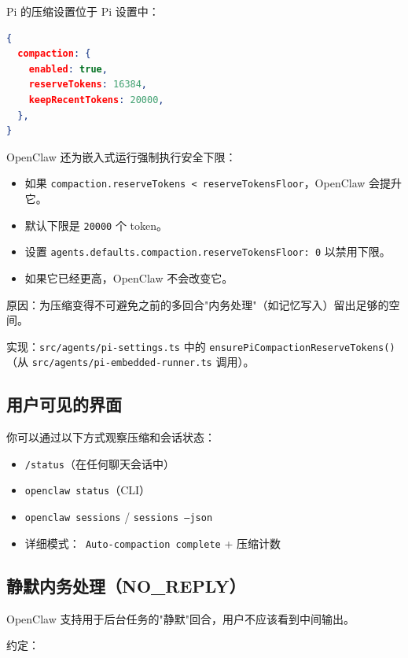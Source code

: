 Pi 的压缩设置位于 Pi 设置中：

\begin{lstlisting}[language=json]
{
  compaction: {
    enabled: true,
    reserveTokens: 16384,
    keepRecentTokens: 20000,
  },
}
\end{lstlisting}


OpenClaw 还为嵌入式运行强制执行安全下限：

\begin{itemize}
  \item 如果 \texttt{compaction.reserveTokens < reserveTokensFloor}，OpenClaw 会提升它。
  \item 默认下限是 \texttt{20000} 个 token。
  \item 设置 \texttt{agents.defaults.compaction.reserveTokensFloor: 0} 以禁用下限。
  \item 如果它已经更高，OpenClaw 不会改变它。
\end{itemize}


原因：为压缩变得不可避免之前的多回合"内务处理"（如记忆写入）留出足够的空间。

实现：\texttt{src/agents/pi-settings.ts} 中的 \texttt{ensurePiCompactionReserveTokens()}（从 \texttt{src/agents/pi-embedded-runner.ts} 调用）。

\hrulefill


\subsection{用户可见的界面}


你可以通过以下方式观察压缩和会话状态：

\begin{itemize}
  \item \texttt{/status}（在任何聊天会话中）
  \item \texttt{openclaw status}（CLI）
  \item \texttt{openclaw sessions} / \texttt{sessions --json}
  \item 详细模式：\texttt{ Auto-compaction complete} + 压缩计数
\end{itemize}


\hrulefill


\subsection{静默内务处理（NO\_REPLY）}


OpenClaw 支持用于后台任务的"静默"回合，用户不应该看到中间输出。

约定：

